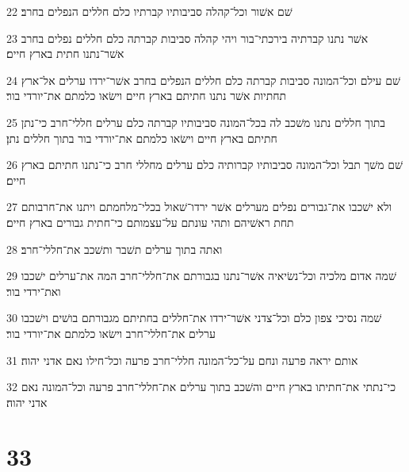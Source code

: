 \par 22 שׁם אשׁור וכל־קהלה סביבותיו קברתיו כלם חללים הנפלים בחרב׃
\par 23 אשׁר נתנו קברתיה בירכתי־בור ויהי קהלה סביבות קברתה כלם חללים נפלים בחרב אשׁר־נתנו חתית בארץ חיים׃
\par 24 שׁם עילם וכל־המונה סביבות קברתה כלם חללים הנפלים בחרב אשׁר־ירדו ערלים אל־ארץ תחתיות אשׁר נתנו חתיתם בארץ חיים וישׂאו כלמתם את־יורדי בור׃
\par 25 בתוך חללים נתנו משׁכב לה בכל־המונה סביבותיו קברתה כלם ערלים חללי־חרב כי־נתן חתיתם בארץ חיים וישׂאו כלמתם את־יורדי בור בתוך חללים נתן׃
\par 26 שׁם משׁך תבל וכל־המונה סביבותיו קברותיה כלם ערלים מחללי חרב כי־נתנו חתיתם בארץ חיים׃
\par 27 ולא ישׁכבו את־גבורים נפלים מערלים אשׁר ירדו־שׁאול בכלי־מלחמתם ויתנו את־חרבותם תחת ראשׁיהם ותהי עונתם על־עצמותם כי־חתית גבורים בארץ חיים׃
\par 28 ואתה בתוך ערלים תשׁבר ותשׁכב את־חללי־חרב׃
\par 29 שׁמה אדום מלכיה וכל־נשׂיאיה אשׁר־נתנו בגבורתם את־חללי־חרב המה את־ערלים ישׁכבו ואת־ירדי בור׃
\par 30 שׁמה נסיכי צפון כלם וכל־צדני אשׁר־ירדו את־חללים בחתיתם מגבורתם בושׁים וישׁכבו ערלים את־חללי־חרב וישׂאו כלמתם את־יורדי בור׃
\par 31 אותם יראה פרעה ונחם על־כל־המונה חללי־חרב פרעה וכל־חילו נאם אדני יהוה׃
\par 32 כי־נתתי את־חתיתו בארץ חיים והשׁכב בתוך ערלים את־חללי־חרב פרעה וכל־המונה נאם אדני יהוה׃

\chapter{33}

